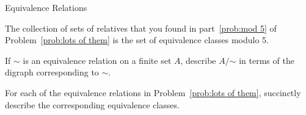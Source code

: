 \begin{section}{Equivalence Relations}
\begin{example}
The collection of sets of relatives that you found in part~\ref{prob:mod 5} of Problem~\ref{prob:lots of them} is the set of equivalence classes modulo 5.
\end{example}

\begin{problem}
If $\sim$ is an equivalence relation on a finite set $A$, describe $A/\mathord\sim$ in terms of the digraph corresponding to $\sim$.
\end{problem}

\begin{problem}
For each of the equivalence relations in Problem~\ref{prob:lots of them}, succinctly describe the corresponding equivalence classes.
\end{problem}

\end{section}